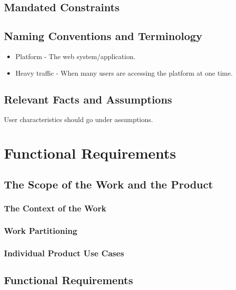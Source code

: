 \documentclass[12pt, titlepage]{article}
\begin{document}
\subsection{Mandated Constraints}

\subsection{Naming Conventions and Terminology}

\begin{itemize}
    \item Platform - The web system/application.
    \item Heavy traffic - When many users are accessing the platform at one time.
\end{itemize}

\subsection{Relevant Facts and Assumptions}

User characteristics should go under assumptions.

\section{Functional Requirements}

\subsection{The Scope of the Work and the Product}

\subsubsection{The Context of the Work}

\subsubsection{Work Partitioning}

\subsubsection{Individual Product Use Cases}

\subsection{Functional Requirements}
\end{document}
